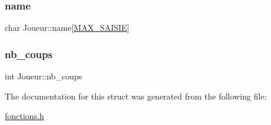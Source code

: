 \hypertarget{structJoueur_ab612f3b383ec2463e302d1f8ba5fc4fd}{}\label{structJoueur_ab612f3b383ec2463e302d1f8ba5fc4fd} 
\subsubsection{\texorpdfstring{name}{name}}
{\footnotesize\ttfamily char Joueur\+::name\mbox{[}\hyperlink{fonctions_8h_a2277af00d169389a0db61a0dbefa2e05}{M\+A\+X\+\_\+\+S\+A\+I\+S\+IE}\mbox{]}}

\hypertarget{structJoueur_af20d1286a923e294405ced5f3c5484cd}{}\label{structJoueur_af20d1286a923e294405ced5f3c5484cd} 
\subsubsection{\texorpdfstring{nb\+\_\+coups}{nb\_coups}}
{\footnotesize\ttfamily int Joueur\+::nb\+\_\+coups}



The documentation for this struct was generated from the following file\+:\begin{DoxyCompactItemize}
\item 
\hyperlink{fonctions_8h}{fonctions.\+h}\end{DoxyCompactItemize}
